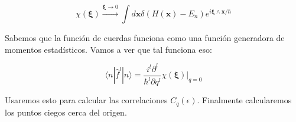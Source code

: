 \documentclass[a4paper,10pt]{article}
\newcommand{\xfase}{\mathbf{x}}
\newcommand{\xifase}{ {\boldsymbol{\xi}} }
\newcommand{\bra}[1]{\langle #1|}
\newcommand{\ket}[1]{|#1\rangle}
\begin{document}
\begin{equation}
\chi(\xifase)\xrightarrow{\xifase\rightarrow 0}
\int d\xfase \delta(H(\xfase)-E_n) e^{i\xifase\wedge\xfase/\hbar}
\end{equation}

Sabemos que la función de cuerdas funciona como una función 
generadora de momentos estadísticos. Vamos a ver que tal funciona eso:

\begin{equation}
\bra{n}\hat{f}^l\ket{n}=\frac{i^l \partial ^l}{\hbar^l \partial q^l}
\chi(\xifase) \lvert_{q=0}
\end{equation}

Usaremos esto para calcular las correlaciones $C_q(\epsilon)$.
Finalmente calcularemos los puntos ciegos cerca del origen.



\end{document}
